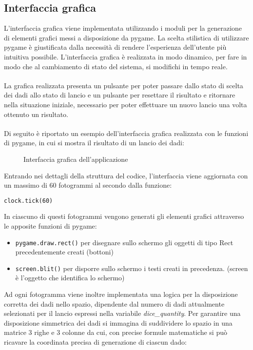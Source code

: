 \subsection{Interfaccia grafica}
L'interfaccia grafica viene implementata utilizzando i moduli per la generazione di elementi grafici messi a disposizione da pygame.
La scelta stilistica di utilizzare pygame è giustificata dalla necessità di rendere l'esperienza dell'utente più intuitiva possibile.
L'interfaccia grafica è realizzata in modo dinamico, per fare in modo che al cambiamento di stato del sistema, si modifichi in tempo reale.
\\\\La grafica realizzata presenta un pulsante per poter passare dallo stato di scelta dei dadi allo stato di lancio e un pulsante per resettare il risultato
e ritornare nella situazione iniziale, necessario per poter effettuare un nuovo lancio una volta ottenuto un risultato.
\\\\Di seguito è riportato un esempio dell'interfaccia grafica realizzata con le funzioni di pygame, in cui si mostra il risultato di un lancio dei dadi:
\begin{figure}[H]
    \centering
    \caption{Interfaccia grafica dell'applicazione}
    \label{fig:RollStateON3}
\end{figure}
Entrando nei dettagli della struttura del codice, l'interfaccia viene aggiornata con un massimo di 60 fotogrammi al secondo dalla funzione:
\begin{verbatim}
clock.tick(60)
\end{verbatim}
In ciascuno di questi fotogrammi vengono generati gli elementi grafici attraverso le apposite funzioni di pygame:
\begin{itemize}
    \item \Verb#pygame.draw.rect()# per disegnare sullo schermo gli oggetti di tipo Rect precedentemente creati (bottoni)
    \item \Verb#screen.blit()# per disporre sullo schermo i testi creati in precedenza. (screen è l'oggetto che identifica lo schermo)
\end{itemize}
Ad ogni fotogramma viene inoltre implementata una logica per la disposizione corretta dei dadi nello spazio, dipendente dal numero di dadi attualmente
selezionati per il lancio espressi nella variabile \textit{dice\_quantity}. Per garantire una disposizione simmetrica dei dadi si immagina di
suddividere lo spazio in una matrice 3 righe e 3 colonne da cui, con precise formule matematiche si può ricavare la coordinata precisa di generazione di ciascun dado:
